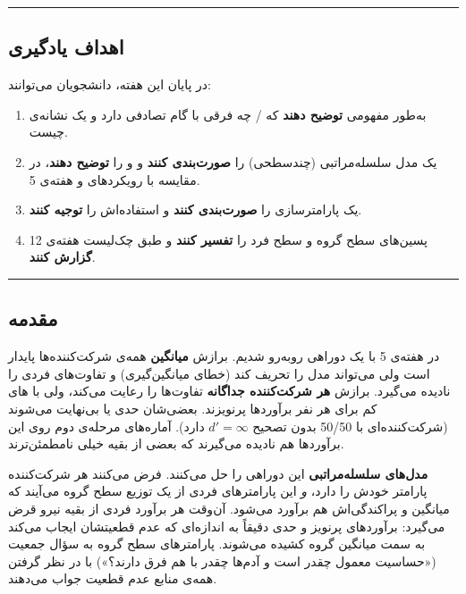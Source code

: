 \begin{center}\rule{0.5\linewidth}{0.5pt}\end{center}

\subsection{اهداف یادگیری}

در پایان این هفته، دانشجویان می‌توانند:

\begin{enumerate}
\def\labelenumi{\arabic{enumi}.}
\tightlist
\item
  به‌طور مفهومی \textbf{توضیح دهند} که  /
   چه فرقی با  گام تصادفی دارد و یک
   نشانه‌ی چیست.
\item
  یک مدل سلسله‌مراتبی (چندسطحی) را \textbf{صورت‌بندی کنند} و  و  را \textbf{توضیح دهند}، در مقایسه با
  رویکردهای  و  هفته‌ی 5.
\item
  یک پارامترسازی  را \textbf{صورت‌بندی کنند} و
  استفاده‌اش را \textbf{توجیه کنند}.
\item
  پسین‌های سطح گروه و سطح فرد را \textbf{تفسیر کنند} و طبق چک‌لیست هفته‌ی
  12 \textbf{گزارش کنند}.
\end{enumerate}

\begin{center}\rule{0.5\linewidth}{0.5pt}\end{center}

\subsection{مقدمه}

در هفته‌ی 5 با یک دوراهی روبه‌رو شدیم. برازش \textbf{میانگین} همه‌ی
شرکت‌کننده‌ها پایدار است ولی می‌تواند مدل را تحریف کند (خطای میانگین‌گیری) و
تفاوت‌های فردی را نادیده می‌گیرد. برازش \textbf{هر شرکت‌کننده جداگانه}
تفاوت‌ها را رعایت می‌کند، ولی با های کم برای هر نفر برآوردها
پرنویزند. بعضی‌شان حدی یا بی‌نهایت می‌شوند (شرکت‌کننده‌ای با 50/50 
بدون تصحیح \(d' = \infty\) دارد). آماره‌های مرحله‌ی دوم روی این برآوردها
هم نادیده می‌گیرند که بعضی از بقیه خیلی نامطمئن‌ترند.

\textbf{مدل‌های سلسله‌مراتبی} این دوراهی را حل می‌کنند. فرض می‌کنند هر
شرکت‌کننده پارامتر خودش را دارد، \emph{و} این پارامترهای فردی از یک توزیع
سطح گروه می‌آیند که میانگین و پراکندگی‌اش هم برآورد می‌شود. آن‌وقت هر برآورد
فردی از بقیه نیرو قرض می‌گیرد: برآوردهای پرنویز و حدی دقیقاً به اندازه‌ای
که عدم قطعیتشان ایجاب می‌کند به سمت میانگین گروه کشیده 
می‌شوند. پارامترهای سطح گروه به سؤال جمعیت («حساسیت معمول چقدر است و
آدم‌ها چقدر با هم فرق دارند؟») با در نظر گرفتن همه‌ی منابع عدم قطعیت جواب
می‌دهند.

